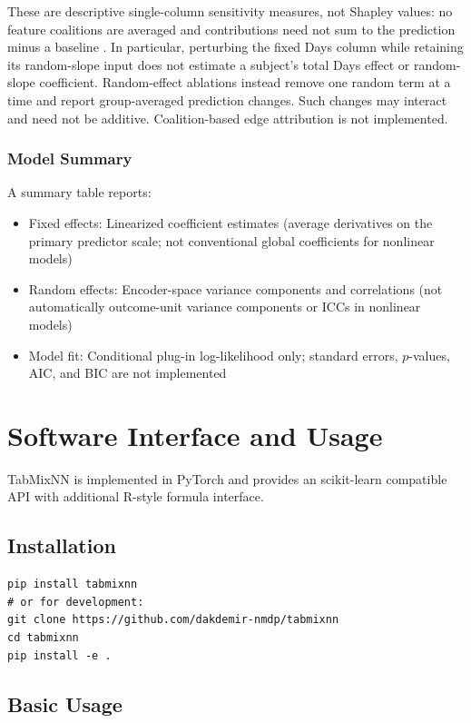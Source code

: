 \documentclass[12pt,a4paper]{article}
\begin{document}
These are descriptive single-column sensitivity measures, not Shapley values: no feature coalitions are averaged and contributions need not sum to the prediction minus a baseline \citep{lundberg2017unified}. In particular, perturbing the fixed Days column while retaining its random-slope input does not estimate a subject's total Days effect or random-slope coefficient. Random-effect ablations instead remove one random term at a time and report group-averaged prediction changes. Such changes may interact and need not be additive. Coalition-based edge attribution is not implemented.

\subsubsection{Model Summary}

A summary table reports:
\begin{itemize}
    \item Fixed effects: Linearized coefficient estimates (average derivatives on the primary predictor scale; not conventional global coefficients for nonlinear models)
    \item Random effects: Encoder-space variance components and correlations (not automatically outcome-unit variance components or ICCs in nonlinear models)
    \item Model fit: Conditional plug-in log-likelihood only; standard errors, $p$-values, AIC, and BIC are not implemented
\end{itemize}

\section{Software Interface and Usage}
\label{sec:usage}

TabMixNN is implemented in PyTorch and provides an scikit-learn compatible API with additional R-style formula interface.

\subsection{Installation}

\begin{lstlisting}
pip install tabmixnn
# or for development:
git clone https://github.com/dakdemir-nmdp/tabmixnn
cd tabmixnn
pip install -e .
\end{lstlisting}

\subsection{Basic Usage}
\end{document}
